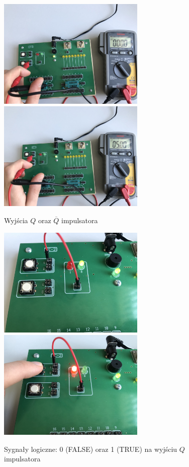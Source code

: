 \documentclass[14pt, table]{extarticle}
\begin{document}
\begin{figure}[H]
\includegraphics[width=7cm]{C65}
\includegraphics[width=7cm]{C64}
\centering
\captionsetup{labelformat=empty}
\caption{Wyjścia $Q$ oraz $\overline{Q}$ impulsatora}
\end{figure}

\begin{figure}[H]
\includegraphics[width=7cm]{C66}
\includegraphics[width=7cm]{C67}
\centering
\captionsetup{labelformat=empty}
\caption{Sygnały logiczne: 0 (FALSE) oraz 1 (TRUE) na wyjściu $Q$ impulsatora}
\end{figure}
\end{document}
